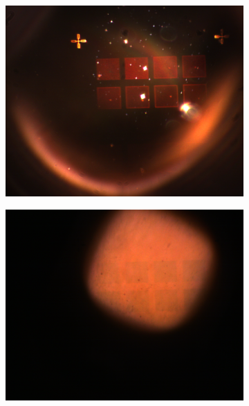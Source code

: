 \begin{figure}[ht]
    \begin{subfigure}{0.3\linewidth}
      \includegraphics[width=\linewidth]{data/Gruppe2/image_3.png}
      \caption{}
      \label{fig:subfig4}
    \end{subfigure}
    \begin{subfigure}{0.3\linewidth}
      \includegraphics[width=\linewidth]{data/Gruppe2/image_4.png}
      \caption{}
      \label{fig:subfig5}
    \end{subfigure}
    \begin{subfigure}{0.3\linewidth}

\end{subfigure}
\end{figure}
